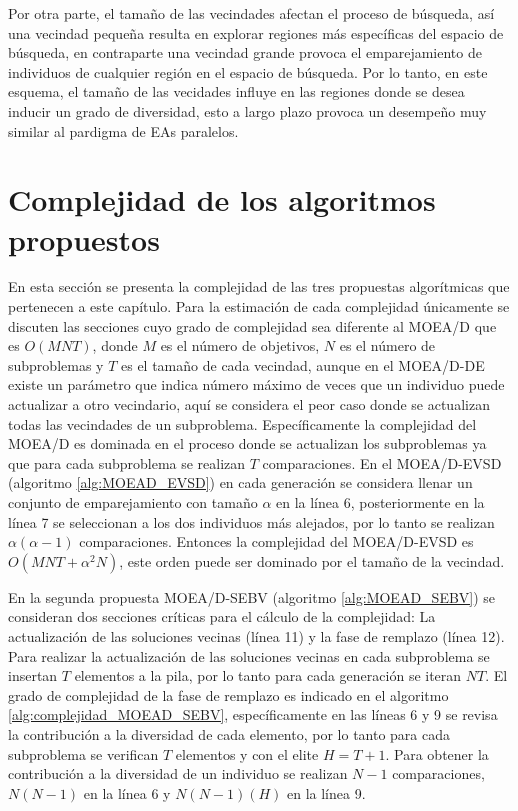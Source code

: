 Por otra parte, el tamaño de las vecindades afectan el proceso de búsqueda, así una vecindad pequeña resulta en explorar regiones más específicas del espacio de búsqueda, en contraparte una vecindad grande provoca el emparejamiento de individuos de cualquier región en el espacio de búsqueda.
%
Por lo tanto, en este esquema, el tamaño de las vecidades influye en las regiones donde se desea inducir un grado de diversidad, esto a largo plazo provoca un desempeño muy similar al pardigma de EAs paralelos.
%


\section{Complejidad de los algoritmos propuestos }

En esta sección se presenta la complejidad de las tres propuestas algorítmicas que pertenecen a este capítulo.
%
Para la estimación de cada complejidad únicamente se discuten las secciones cuyo grado de complejidad sea diferente al MOEA/D que es $O(MNT)$, donde $M$ es el número de objetivos, $N$ es el número de subproblemas y $T$ es el tamaño de cada vecindad, aunque en el MOEA/D-DE existe un parámetro que indica número máximo de veces que un individuo puede actualizar a otro vecindario, aquí se considera el peor caso donde se actualizan todas las vecindades de un subproblema.
%
Específicamente la complejidad del MOEA/D es dominada en el proceso donde se actualizan los subproblemas ya que para cada subproblema se realizan $T$ comparaciones.
%
En el MOEA/D-EVSD (algoritmo \ref{alg:MOEAD_EVSD}) en cada generación se considera llenar un conjunto de emparejamiento con tamaño $\alpha$ en la línea 6, posteriormente en la línea 7 se seleccionan a los dos individuos más alejados, por lo tanto se realizan $\alpha(\alpha-1)$ comparaciones.
%
Entonces la complejidad del MOEA/D-EVSD es $O(MNT + \alpha^2N)$, este orden puede ser dominado por el tamaño de la vecindad.
%

En la segunda propuesta MOEA/D-SEBV (algoritmo \ref{alg:MOEAD_SEBV}) se consideran dos secciones críticas para el cálculo de la complejidad: La actualización de las soluciones vecinas (línea 11) y la fase de remplazo (línea 12).
%
Para realizar la actualización de las soluciones vecinas en cada subproblema se insertan $T$ elementos a la pila, por lo tanto para cada generación se iteran $NT$.
%
El grado de complejidad de la fase de remplazo es indicado en el algoritmo \ref{alg:complejidad_MOEAD_SEBV}, específicamente en las líneas 6 y 9 se revisa la contribución a la diversidad de cada elemento, por lo tanto para cada subproblema se verifican $T$ elementos y con el elite $H=T+1$.
%
Para obtener la contribución a la diversidad de un individuo se realizan $N-1$ comparaciones, $N(N-1)$ en la línea 6 y $N(N-1)(H)$ en la línea 9.

